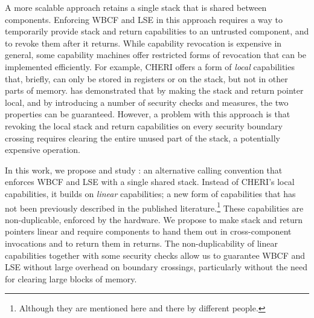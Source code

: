 \documentclass[acmsmall,review,anonymous]{acmart}\settopmatter{printfolios=true,printccs=false,printacmref=false}
\begin{document}
A more scalable approach retains a single stack that is shared between components.
Enforcing WBCF and LSE in this approach requires a way to temporarily provide stack and return capabilities to an untrusted component, and to revoke them after it returns.
While capability revocation is expensive in general, some capability machines offer restricted forms of revocation that can be implemented efficiently.
For example, CHERI offers a form of {\itshape local} capabilities that, briefly, can only be stored in registers or on the stack, but not in other parts of memory.
\citet{skorstengaard_reasoning_2017} has demonstrated that by making the stack and return pointer local, and by introducing a number of security checks and measures, the two properties can be guaranteed.
However, a problem with this approach is that revoking the local stack and return capabilities on every security boundary crossing requires clearing the entire unused part of the stack, a potentially expensive operation.

In this work, we propose and study \stktokens{}: an alternative calling convention that enforces WBCF and LSE with a single shared stack.
Instead of CHERI's local capabilities, it builds on {\itshape linear} capabilities; a new form of capabilities that has not been previously described in the published literature.\footnote{Although they are mentioned here and there by different people.}
These capabilities are non-duplicable, enforced by the hardware.
We propose to make stack and return pointers linear and require components to hand them out in cross-component invocations and to return them in returns.
The non-duplicability of linear capabilities together with some security checks allow us to guarantee WBCF and LSE without large overhead on boundary crossings, particularly without the need for clearing large blocks of memory.
\end{document}
